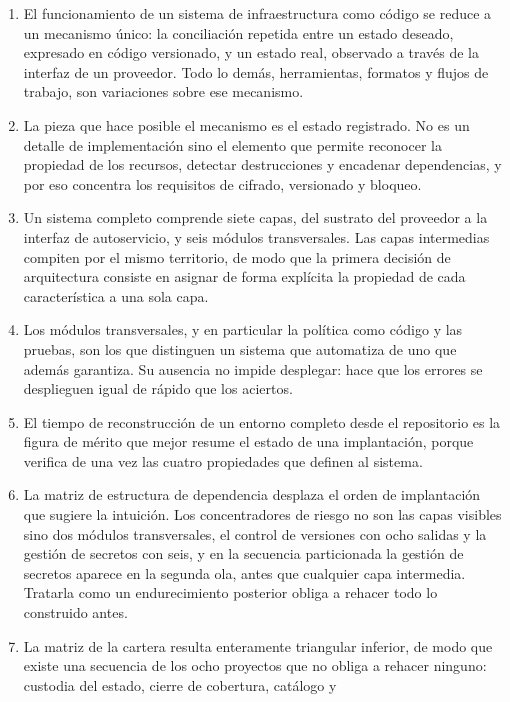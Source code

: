 \documentclass[11pt,letterpaper]{article}
\begin{document}
\begin{enumerate}
  \item El funcionamiento de un sistema de infraestructura como código se
    reduce a un mecanismo único: la conciliación repetida entre un estado
    deseado, expresado en código versionado, y un estado real, observado a
    través de la interfaz de un proveedor. Todo lo demás, herramientas,
    formatos y flujos de trabajo, son variaciones sobre ese mecanismo.
  \item La pieza que hace posible el mecanismo es el estado registrado. No es
    un detalle de implementación sino el elemento que permite reconocer la
    propiedad de los recursos, detectar destrucciones y encadenar dependencias,
    y por eso concentra los requisitos de cifrado, versionado y bloqueo.
  \item Un sistema completo comprende siete capas, del sustrato del proveedor
    a la interfaz de autoservicio, y seis módulos transversales. Las capas
    intermedias compiten por el mismo territorio, de modo que la primera
    decisión de arquitectura consiste en asignar de forma explícita la
    propiedad de cada característica a una sola capa.
  \item Los módulos transversales, y en particular la política como código y
    las pruebas, son los que distinguen un sistema que automatiza de uno que
    además garantiza. Su ausencia no impide desplegar: hace que los errores se
    desplieguen igual de rápido que los aciertos.
  \item El tiempo de reconstrucción de un entorno completo desde el
    repositorio es la figura de mérito que mejor resume el estado de una
    implantación, porque verifica de una vez las cuatro propiedades que
    definen al sistema.
  \item La matriz de estructura de dependencia desplaza el orden de
    implantación que sugiere la intuición. Los concentradores de riesgo no son
    las capas visibles sino dos módulos transversales, el control de versiones
    con ocho salidas y la gestión de secretos con seis, y en la secuencia
    particionada la gestión de secretos aparece en la segunda ola, antes que
    cualquier capa intermedia. Tratarla como un endurecimiento posterior
    obliga a rehacer todo lo construido antes.
  \item La matriz de la cartera resulta enteramente triangular inferior, de
    modo que existe una secuencia de los ocho proyectos que no obliga a
    rehacer ninguno: custodia del estado, cierre de cobertura, catálogo y

\end{enumerate}
\end{document}
